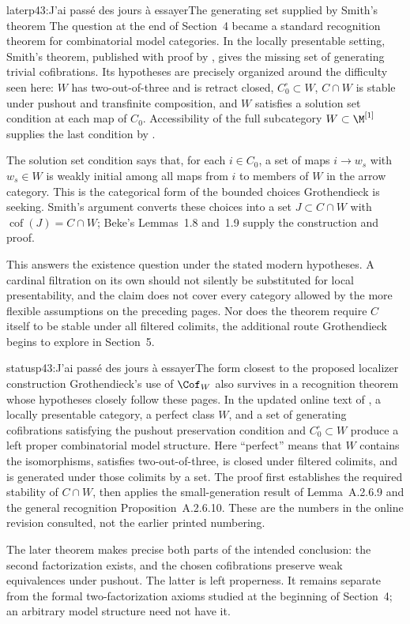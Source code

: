 \begin{dcomment}{later}{p43:J'ai passé des jours à essayer}{The generating set supplied by Smith's theorem}
The question at the end of Section~4 became a standard recognition theorem for combinatorial model categories. In the locally presentable setting, Smith's theorem, published with proof by \citet[Theorem~1.7]{Beke2000}, gives the missing set of generating trivial cofibrations. Its hypotheses are precisely organized around the difficulty seen here: $W$ has two-out-of-three and is retract closed, $C_0^{\square}\subset W$, $C\cap W$ is stable under pushout and transfinite composition, and $W$ satisfies a solution set condition at each map of $C_0$. Accessibility of the full subcategory $W\subset\M^{[1]}$ supplies the last condition by \citet[Proposition~1.15]{Beke2000}.

The solution set condition says that, for each $i\in C_0$, a set of maps $i\to w_s$ with $w_s\in W$ is weakly initial among all maps from $i$ to members of $W$ in the arrow category. This is the categorical form of the bounded choices Grothendieck is seeking. Smith's argument converts these choices into a set $J\subset C\cap W$ with $\operatorname{cof}(J)=C\cap W$; Beke's Lemmas~1.8 and~1.9 supply the construction and proof.

This answers the existence question under the stated modern hypotheses. A cardinal filtration on its own should not silently be substituted for local presentability, and the claim does not cover every category allowed by the more flexible assumptions on the preceding pages. Nor does the theorem require $C$ itself to be stable under all filtered colimits, the additional route Grothendieck begins to explore in Section~5.
\end{dcomment}

\begin{dcomment}{status}{p43:J'ai passé des jours à essayer}{The form closest to the proposed localizer construction}
Grothendieck's use of $\Cof_W$ also survives in a recognition theorem whose hypotheses closely follow these pages. In the updated online text of \citet[Proposition~A.2.6.15]{Lurie2009HTT}, a locally presentable category, a perfect class $W$, and a set of generating cofibrations satisfying the pushout preservation condition and $C_0^{\square}\subset W$ produce a left proper combinatorial model structure. Here ``perfect'' means that $W$ contains the isomorphisms, satisfies two-out-of-three, is closed under filtered colimits, and is generated under those colimits by a set. The proof first establishes the required stability of $C\cap W$, then applies the small-generation result of Lemma~A.2.6.9 and the general recognition Proposition~A.2.6.10. These are the numbers in the online revision consulted, not the earlier printed numbering.

The later theorem makes precise both parts of the intended conclusion: the second factorization exists, and the chosen cofibrations preserve weak equivalences under pushout. The latter is left properness. It remains separate from the formal two-factorization axioms studied at the beginning of Section~4; an arbitrary model structure need not have it.
\end{dcomment}


